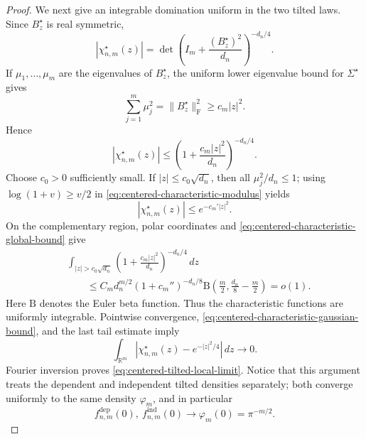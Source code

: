 \begin{proof}
We next give an integrable domination uniform in the two tilted laws.
Since \(B_z^\star\) is real symmetric,
\begin{equation}
\label{eq:centered-characteristic-modulus}
 |\chi_{n,m}^{\star}(z)|
 =
 \det\left(
 I_m+\frac{(B_z^\star)^2}{d_n}
 \right)^{-d_n/4}.
\end{equation}
If \(\mu_1,\ldots,\mu_m\) are the eigenvalues of \(B_z^\star\), the
uniform lower eigenvalue bound for \(\Sigma^\star\) gives
\[
 \sum_{j=1}^m\mu_j^2
 =
 \|B_z^\star\|_{\mathrm F}^2
 \ge c_m|z|^2.
\]
Hence
\begin{equation}
\label{eq:centered-characteristic-global-bound}
 |\chi_{n,m}^{\star}(z)|
 \le
 \left(1+\frac{c_m|z|^2}{d_n}\right)^{-d_n/4}.
\end{equation}
Choose \(c_0>0\) sufficiently small. If
\(|z|\le c_0\sqrt{d_n}\), then all
\(\mu_j^2/d_n\le1\); using \(\log(1+v)\ge v/2\) in
\eqref{eq:centered-characteristic-modulus} yields
\begin{equation}
\label{eq:centered-characteristic-gaussian-bound}
 |\chi_{n,m}^{\star}(z)|\le e^{-c_m'|z|^2}.
\end{equation}
On the complementary region, polar coordinates and
\eqref{eq:centered-characteristic-global-bound} give
\begin{align*}
 &\int_{|z|>c_0\sqrt{d_n}}
 \left(1+\frac{c_m|z|^2}{d_n}\right)^{-d_n/4}\,dz\\
 &\qquad\le
 C_m d_n^{m/2}(1+c_m'')^{-d_n/8}
 \mathrm B\left(\frac m2,\frac{d_n}{8}-\frac m2\right)
 =o(1).
\end{align*}
Here \(\mathrm B\) denotes the Euler beta function.
Thus the characteristic functions are uniformly integrable. Pointwise
convergence, \eqref{eq:centered-characteristic-gaussian-bound}, and the
last tail estimate imply
\[
 \int_{\mathbb R^m}
 \left|\chi_{n,m}^{\star}(z)-e^{-|z|^2/4}\right|\,dz
 \longrightarrow0.
\]
Fourier inversion proves \eqref{eq:centered-tilted-local-limit}. Notice
that this argument treats the dependent and independent tilted densities
separately; both converge uniformly to the same density \(\varphi_m\), and
in particular
\[
 f_{n,m}^{\mathrm{dep}}(0),
 \ f_{n,m}^{\mathrm{ind}}(0)
 \longrightarrow
 \varphi_m(0)=\pi^{-m/2}.
\]


\end{proof}

